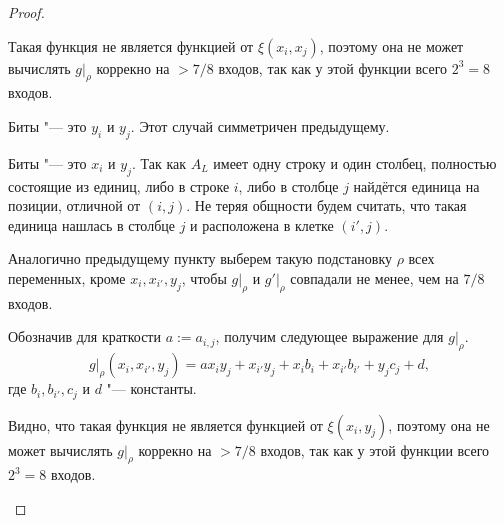 \documentclass[a4paper, 14pt]{extarticle}
\begin{document}
\begin{proof}
\begin{description}
Такая функция не является функцией от $\xi(x_i, x_j)$, поэтому она не может
вычислять $g \rvert _ \rho$ коррекно на $> 7/8$ входов, так как у этой функции
всего $2^3 = 8$ входов.


\item{Биты "--- это $y_i$ и $y_j$.} Этот случай симметричен предыдущему.
\item{Биты "--- это $x_i$ и $y_j$.} Так как $A_L$ имеет одну строку и один
столбец, полностью состоящие из единиц, либо в строке $i$, либо в столбце $j$
найдётся единица на позиции, отличной от $(i, j)$. Не теряя общности будем
считать, что такая единица нашлась в столбце $j$ и расположена в клетке $(i',
j)$.

Аналогично предыдущему пункту выберем такую подстановку $\rho$ всех переменных,
кроме $x_i, x_{i'}, y_j$, чтобы $g \rvert _ \rho$ и $g' \rvert _ \rho$ совпадали
не менее, чем на $7/8$ входов.

Обозначив для краткости $a := a_{i, j}$, получим следующее выражение для $g
\rvert _ \rho$.
\[
g \rvert _ \rho (x_i, x_{i'}, y_j) = a x_i y_j + x_{i'} y_j + x_i b_i + x_{i'} b_{i'} + y_j c_j + d,
\]
где $b_{i}, b_{i'}, c_j$ и $d$ "--- константы.

Видно, что такая функция не является функцией от $\xi(x_i, y_j)$, поэтому она не
может вычислять $g \rvert _ \rho$ коррекно на $> 7/8$ входов, так как у этой
функции всего $2^3 = 8$ входов.
\end{description}
\end{proof}
\end{document}
